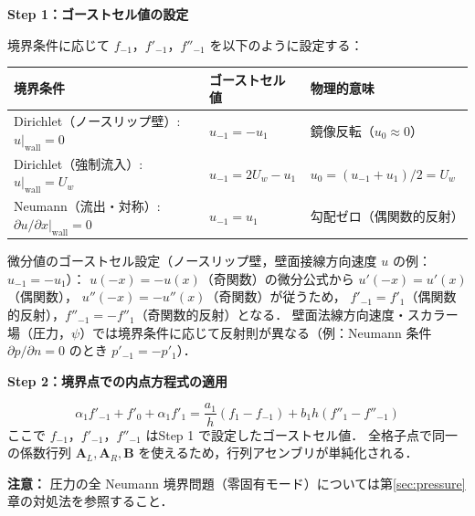 \begin{tcolorbox}[algbox, title={ゴーストセルの設定手順（左境界 $i=0$ の例）}]
\textbf{Step 1：ゴーストセル値の設定}

境界条件に応じて $f_{-1}$，$f'_{-1}$，$f''_{-1}$ を以下のように設定する：

\begin{center}
\PaperTableSetup
\begin{tabular}{lll}
\hline
境界条件 & ゴーストセル値 & 物理的意味 \\
\hline
Dirichlet（ノースリップ壁）: $u|_{\mathrm{wall}}=0$ &
  $u_{-1} = -u_1$ &
  鏡像反転（$u_{0} \approx 0$） \\
Dirichlet（強制流入）: $u|_{\mathrm{wall}}=U_w$ &
  $u_{-1} = 2U_w - u_1$ &
  $u_{0} = (u_{-1}+u_1)/2 = U_w$ \\
Neumann（流出・対称）: $\partial u/\partial x|_{\mathrm{wall}}=0$ &
  $u_{-1} = u_1$ &
  勾配ゼロ（偶関数的反射） \\
\hline
\end{tabular}
\end{center}

微分値のゴーストセル設定（ノースリップ壁，壁面接線方向速度 $u$ の例：$u_{-1}=-u_1$）：
$u(-x) = -u(x)$（奇関数）の微分公式から $u'(-x) = u'(x)$（偶関数），
$u''(-x) = -u''(x)$（奇関数）が従うため，
$f'_{-1} = f'_1$（偶関数的反射），$f''_{-1} = -f''_1$（奇関数的反射）となる．
壁面法線方向速度・スカラー場（圧力，$\psi$）では境界条件に応じて反射則が異なる（例：Neumann 条件 $\partial p/\partial n=0$ のとき $p'_{-1}=-p'_1$）．

\textbf{Step 2：境界点での内点方程式の適用}

\begin{equation}
  \alpha_1 f'_{-1} + f'_0 + \alpha_1 f'_1
  = \frac{a_1}{h}(f_1 - f_{-1}) + b_1 h(f''_1 - f''_{-1})
  \label{eq:ccd_ghost_eq}
\end{equation}
ここで $f_{-1}$，$f'_{-1}$，$f''_{-1}$ はStep 1 で設定したゴーストセル値．
全格子点で同一の係数行列 $\mathbf{A}_L, \mathbf{A}_R, \mathbf{B}$ を使えるため，行列アセンブリが単純化される．

\textbf{注意：} 圧力の全 Neumann 境界問題（零固有モード）については第\ref{sec:pressure}章の対処法を参照すること．
\end{tcolorbox}

